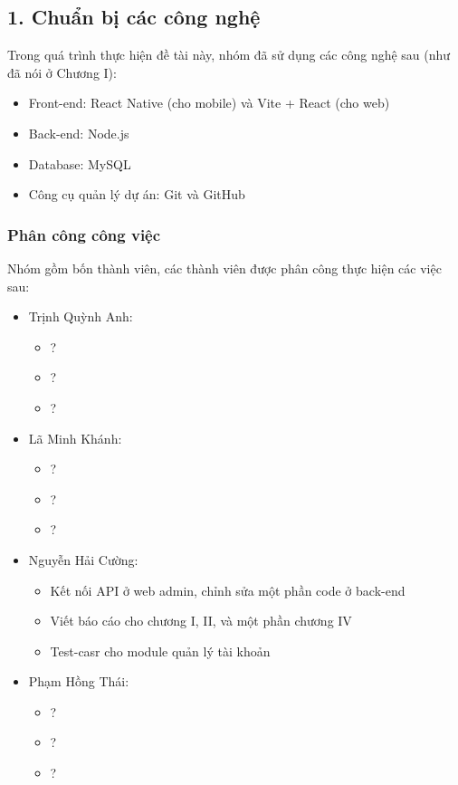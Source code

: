 \documentclass[../main.tex]{subfiles}
\begin{document}
\subsection*{1. Chuẩn bị các công nghệ}

Trong quá trình thực hiện đề tài này, nhóm đã sử dụng các công nghệ sau (như đã nói ở Chương I):

\begin{itemize}
    \item Front-end: React Native (cho mobile) và Vite + React (cho web)
    \item Back-end: Node.js
    \item Database: MySQL
    \item Công cụ quản lý dự án: Git và GitHub
\end{itemize}

\subsubsection*{Phân công công việc}
Nhóm gồm bốn thành viên, các thành viên được phân công thực hiện các việc sau:

\begin{itemize}
    \item Trịnh Quỳnh Anh:
    \begin{itemize}
        \item ?
        \item ?
        \item ?
    \end{itemize}
    \item Lã Minh Khánh:
    \begin{itemize}
        \item ?
        \item ?
        \item ?
    \end{itemize}
    \item Nguyễn Hải Cường:
    \begin{itemize}
        \item Kết nối API ở web admin, chỉnh sửa một phần code ở back-end
        \item Viết báo cáo cho chương I, II, và một phần chương IV
        \item Test-casr cho module quản lý tài khoản
    \end{itemize}
    \item Phạm Hồng Thái:
    \begin{itemize}
        \item ?
        \item ?
        \item ?
    \end{itemize}
\end{itemize}
\end{document}
